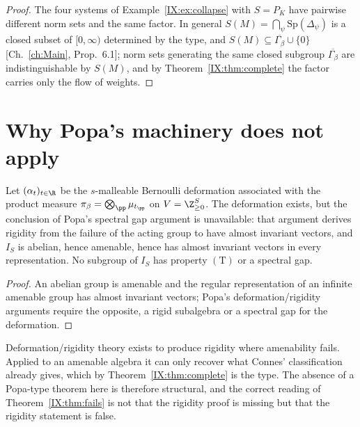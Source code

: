 \begin{proof}
The four systems of Example~\ref{IX:ex:collapse} with $S=P_K$ have pairwise different norm
sets and the same factor. In general $S(M)=\bigcap_{\psi}\mathrm{Sp}(\Delta_\psi)$ is a closed
subset of $[0,\infty)$ determined by the type, and $S(M)\subseteq\overline{\Gamma_\beta}\cup\{0\}$
[Ch.~\ref{ch:Main}, Prop.~6.1]; norm sets generating the same closed subgroup $\overline{\Gamma_\beta}$
are indistinguishable by $S(M)$, and by Theorem~\ref{IX:thm:complete} the factor carries only
the flow of weights.
\end{proof}

\section{Why Popa's machinery does not apply}

\begin{proposition}\label{IX:prop:nogap}
Let $(\alpha_t)_{t\in\R}$ be the $s$-malleable Bernoulli deformation associated with the
product measure $\pi_\beta=\bigotimes_\pp\mu_{t_\pp}$ on $V=\Z_{\ge0}^S$. The deformation
exists, but the conclusion of Popa's spectral gap argument is unavailable: that argument
derives rigidity from the failure of the acting group to have almost invariant vectors, and
$I_S$ is abelian, hence amenable, hence has almost invariant vectors in every
representation. No subgroup of $I_S$ has property $(\mathrm T)$ or a spectral gap.
\end{proposition}

\begin{proof}
An abelian group is amenable and the regular representation of an infinite amenable group has
almost invariant vectors; Popa's deformation/rigidity arguments \cite{Popa} require the
opposite, a rigid subalgebra or a spectral gap for the deformation.
\end{proof}

\begin{remark}\label{IX:rem:notgap}
Deformation/rigidity theory exists to produce rigidity where amenability fails. Applied to an
amenable algebra it can only recover what Connes' classification already gives, which by
Theorem~\ref{IX:thm:complete} is the type. The absence of a Popa-type theorem here is therefore
structural, and the correct reading of Theorem~\ref{IX:thm:fails} is not that the rigidity proof
is missing but that the rigidity statement is false.
\end{remark}

